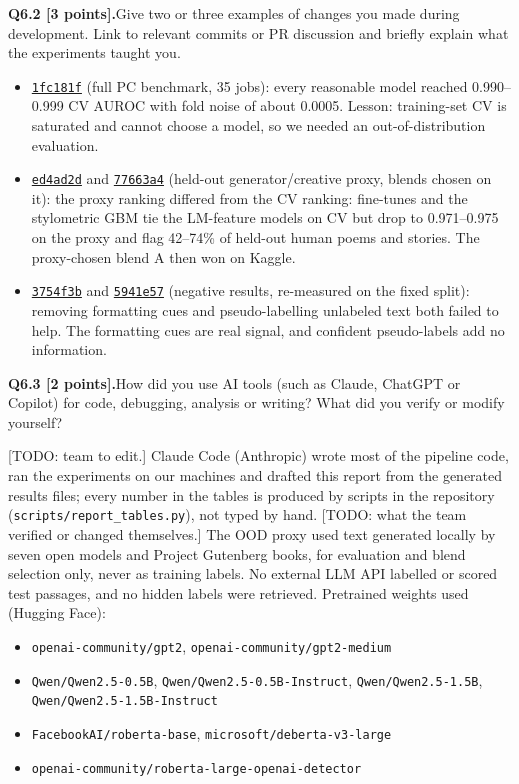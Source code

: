 \documentclass[11pt,letterpaper]{article}
\newcommand{\question}[2]{\needspace{4\baselineskip}\par\addvspace{0.45em}\noindent\textbf{#1}\quad #2\par\nobreak\vspace{0.1em}}
\newcommand{\commit}[2]{\href{https://github.com/ZhenmanShen/human-or-ai-submissions/commit/#1}{\texttt{#2}}}
\begin{document}
\question{Q6.2 [3 points].}{Give two or three examples of changes you made during development. Link to relevant commits or PR discussion and briefly explain what the experiments taught you.}
\begin{itemize}
\item \commit{1fc181fef044ef79830a9a0db09f32bc305f38e0}{1fc181f} (full PC benchmark, 35 jobs): every reasonable model reached 0.990--0.999 CV AUROC with fold noise of about 0.0005. Lesson: training-set CV is saturated and cannot choose a model, so we needed an out-of-distribution evaluation.
\item \commit{ed4ad2daeabbb6f05fc791791dff0edf34ced42e}{ed4ad2d} and \commit{77663a46bfcbc667df49d3aeb81d00485319b2f8}{77663a4} (held-out generator/creative proxy, blends chosen on it): the proxy ranking differed from the CV ranking: fine-tunes and the stylometric GBM tie the LM-feature models on CV but drop to 0.971--0.975 on the proxy and flag 42--74\% of held-out human poems and stories. The proxy-chosen blend A then won on Kaggle.
\item \commit{3754f3b7f2d07855ff6e01a9ef753e7f575d4698}{3754f3b} and \commit{5941e57fa758b3624c5587f21f0f835c4c76fdf3}{5941e57} (negative results, re-measured on the fixed split): removing formatting cues and pseudo-labelling unlabeled text both failed to help. The formatting cues are real signal, and confident pseudo-labels add no information.
\end{itemize}

\question{Q6.3 [2 points].}{How did you use AI tools (such as Claude, ChatGPT or Copilot) for code, debugging, analysis or writing? What did you verify or modify yourself?}
[TODO: team to edit.] Claude Code (Anthropic) wrote most of the pipeline code, ran the experiments on our machines and drafted this report from the generated results files; every number in the tables is produced by scripts in the repository (\texttt{scripts/report\_tables.py}), not typed by hand. [TODO: what the team verified or changed themselves.] The OOD proxy used text generated locally by seven open models and Project Gutenberg books, for evaluation and blend selection only, never as training labels. No external LLM API labelled or scored test passages, and no hidden labels were retrieved. Pretrained weights used (Hugging Face):
{\small\begin{itemize}
\item \texttt{openai-community/gpt2}, \texttt{openai-community/gpt2-medium}
\item \texttt{Qwen/Qwen2.5-0.5B}, \texttt{Qwen/Qwen2.5-0.5B-Instruct}, \texttt{Qwen/Qwen2.5-1.5B}, \texttt{Qwen/Qwen2.5-1.5B-Instruct}
\item \texttt{FacebookAI/roberta-base}, \texttt{microsoft/deberta-v3-large}
\item \texttt{openai-community/roberta-large-openai-detector}
\end{itemize}}
\end{document}
